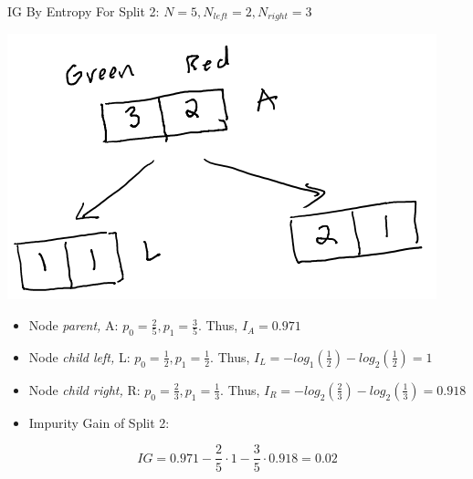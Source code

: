 \documentclass[
  ignorenonframetext,
]{beamer}
\begin{document}
\begin{frame}{IG By Entropy}
\label{ig-by-entropy-1}
For Split 2: \(N = 5, N_{left} =2, N_{right} = 3\)

\includegraphics{images/im3.png}

\begin{itemize}
\item
  Node \emph{parent,} A: \(p_0 = \frac{2}{5}, p_1 = \frac{3}{5}\). Thus,
  \(I_{A} = 0.971\)
\item
  Node \emph{child left,} L: \(p_0 = \frac{1}{2}, p_1 = \frac{1}{2}\).
  Thus, \(I_{L} = - log_1(\frac{1}{2})-log_2(\frac{1}{2})=1\)
\item
  Node \emph{child right,} R: \(p_0 = \frac{2}{3}, p_1 = \frac{1}{3}\).
  Thus, \(I_{R} = -log_2(\frac{2}{3}) -log_2(\frac{1}{3}) = 0.918\)
\item
  Impurity Gain of Split 2:
\end{itemize}

\[IG = 0.971 - \frac{2}{5} \cdot 1-\frac{3}{5} \cdot 0.918 = 0.02\]
\end{frame}
\end{document}
